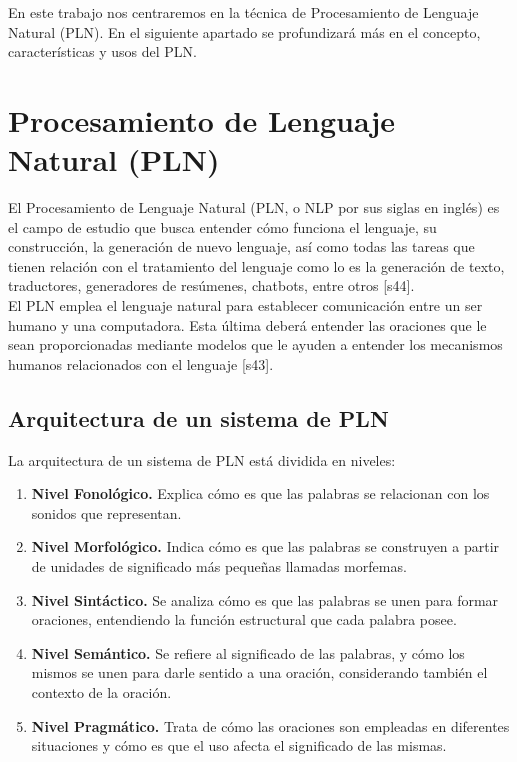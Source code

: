 En este trabajo nos centraremos en la técnica de Procesamiento de Lenguaje Natural (PLN). En el siguiente apartado se profundizará más en el concepto, características y usos del PLN.


\section{Procesamiento de Lenguaje Natural (PLN)}
El Procesamiento de Lenguaje Natural (PLN, o NLP por sus siglas en inglés) es el campo de estudio que busca entender cómo funciona el lenguaje, su construcción, la generación de nuevo lenguaje, así como todas las tareas que tienen relación con el tratamiento del lenguaje como lo es la generación de texto, traductores, generadores de resúmenes, chatbots, entre otros [s44].\\

El PLN emplea el lenguaje natural para establecer comunicación entre un ser humano y una computadora. Esta última deberá entender las oraciones que le sean proporcionadas mediante modelos que le ayuden a entender los mecanismos humanos relacionados con el lenguaje [s43]. 


\subsection{Arquitectura de un sistema de PLN}

La arquitectura de un sistema de PLN está dividida en niveles:\

\begin{enumerate}[label=\alph*.]
    \item \textbf{Nivel Fonológico.} Explica cómo es que las palabras se relacionan con los sonidos que representan.
    \item \textbf{Nivel Morfológico.} Indica cómo es que las palabras se construyen a partir de unidades de significado más pequeñas llamadas morfemas.
    \item \textbf{Nivel Sintáctico.} Se analiza cómo es que las palabras se unen para formar oraciones, entendiendo la función estructural que cada palabra posee.
    \item \textbf{Nivel Semántico.} Se refiere al significado de las palabras, y cómo los mismos se unen para darle sentido a una oración, considerando también el contexto de la oración.
    \item \textbf{Nivel Pragmático.} Trata de cómo las oraciones son empleadas en diferentes situaciones y cómo es que el uso afecta el significado de las mismas.
\end{enumerate}

